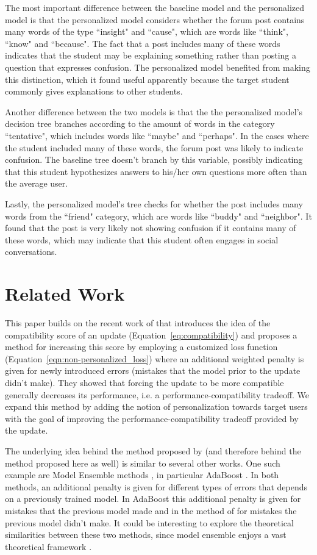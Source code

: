 \documentclass[letterpaper]{article} %
\theoremstyle{definition}
\begin{document}
The most important difference between the baseline model and the personalized model is that the personalized model considers whether the forum post contains many words of the type ``insight" and ``cause", which are words like ``think", ``know" and ``because".
The fact that a post includes many of these words indicates that the student may be explaining something rather than posting a question that expresses confusion.
The personalized model benefited from making this distinction, which it found useful apparently because the target student commonly gives explanations to other students.

Another difference between the two models is that the  the personalized model's decision tree branches according to the amount of words in the category ``tentative", which includes words like ``maybe" and ``perhaps". In the cases where the student included many of these words, the forum post was likely to indicate confusion.
The baseline tree doesn't branch by this variable, possibly indicating that this student hypothesizes answers to his/her own questions more often than the average user.

Lastly, the personalized model's tree checks for whether the post includes many words from the ``friend" category, which are words like ``buddy" and ``neighbor". It found that the post is very likely not showing confusion if it contains many of these words, which may indicate that this student often engages in social conversations.
\section{Related Work}

This paper builds on the recent work of \citet{bansal2019updates} that introduces the idea of the compatibility score of an update (Equation~\ref{eq:compatibility}) and proposes a method for increasing this score by employing a customized loss function (Equation~\ref{eqn:non-personalized_loss}) where an additional weighted penalty is given for newly introduced errors (mistakes that the model prior to the update didn't make). They showed that forcing the update to be more compatible generally decreases its performance, i.e. a performance-compatibility tradeoff. We expand this method by adding the notion of personalization towards target users with the goal of improving the performance-compatibility tradeoff provided by the update. %

The underlying idea behind the method proposed by \citet{bansal2019updates} (and therefore behind the method proposed here as well) is similar to several other works. One such example are Model Ensemble methods \cite{opitz1999popular}, in particular AdaBoost \cite{freund1996experiments}. In both methods, an additional penalty is given for different types of errors that depends on a previously trained model. In AdaBoost this additional penalty is given for mistakes that the previous model made and in the method of \citet{bansal2019updates} for mistakes the previous model didn't make.
It could be interesting to explore the theoretical similarities between these two methods, since model ensemble enjoys a vast theoretical framework \cite{freund1996experiments}.
\end{document}
